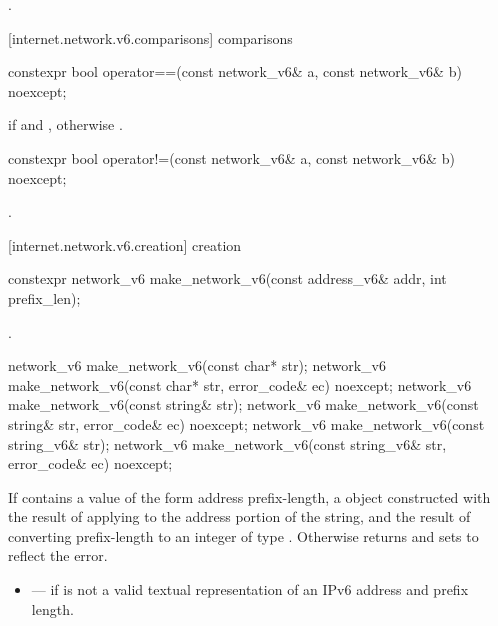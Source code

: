 \begin{itemdescr}
\pnum
\returns {}.
\end{itemdescr}



[internet.network.v6.comparisons]{ comparisons}

\begin{itemdecl}
constexpr bool operator==(const network_v6& a, const network_v6& b) noexcept;
\end{itemdecl}

\begin{itemdescr}
\pnum
\returns {} if  and , otherwise .
\end{itemdescr}

\begin{itemdecl}
constexpr bool operator!=(const network_v6& a, const network_v6& b) noexcept;
\end{itemdecl}

\begin{itemdescr}
\pnum
\returns {}.
\end{itemdescr}



[internet.network.v6.creation]{ creation}

\begin{itemdecl}
constexpr network_v6 make_network_v6(const address_v6& addr, int prefix_len);
\end{itemdecl}

\begin{itemdescr}
\pnum
\returns {}.
\end{itemdescr}

\begin{itemdecl}
network_v6 make_network_v6(const char* str);
network_v6 make_network_v6(const char* str, error_code& ec) noexcept;
network_v6 make_network_v6(const string& str);
network_v6 make_network_v6(const string& str, error_code& ec) noexcept;
network_v6 make_network_v6(const string_v6& str);
network_v6 make_network_v6(const string_v6& str, error_code& ec) noexcept;
\end{itemdecl}

\begin{itemdescr}
\pnum
\returns If  contains a value of the form address  prefix-length, a  object constructed with the result of applying  to the address portion of the string, and the result of converting prefix-length to an integer of type . Otherwise returns  and sets  to reflect the error.

\pnum
\errors
\begin{itemize}
\item
{} --- if  is not a valid textual representation of an IPv6 address and prefix length.
\end{itemize}
\end{itemdescr}



